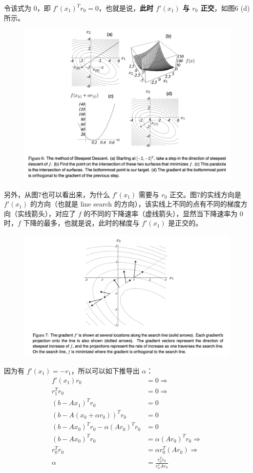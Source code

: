\documentclass[12pt]{article}
\begin{document}
令该式为 0，即 $f'(x_1)^Tr_0 = 0$，也就是说，\textbf{此时 $f'(x_1)$ 与 $r_0$ 正交}，如图6 (d) 所示。
\begin{figure}[H]
    \centering
    \includegraphics[width=1\textwidth]{fig/CG_Plot_SD_1.png}
\end{figure}

另外，从图7也可以看出来，为什么 $f'(x_1)$ 需要与 $r_0$ 正交。图7的实线方向是 $f'(x_1)$ 的方向（也就是 line search 的方向），该实线上不同的点有不同的梯度方向（实线箭头），对应了 $f$ 的不同的下降速率（虚线箭头），显然当下降速率为 0 时，$f$ 下降的最多，也就是说，此时的梯度与 $f'(x_1)$ 是正交的。
\begin{figure}[H]
    \centering
    \includegraphics[width=1\textwidth]{fig/CG_Plot_SD_2.png}
\end{figure}

因为有 $f'(x_1) = -r_1$，所以可以如下推导出 $\alpha$：
\begin{align*}
f'(x_1) r_0 &= 0 \Rightarrow \\
r_1^T r_0 &= 0 \Rightarrow \\
(b - Ax_1)^T r_0 &= 0 \\
(b - A(x_0 + \alpha r_0))^T r_0 &= 0 \\
(b - Ax_0)^T r_0 - \alpha (A r_0)^T r_0 &= 0 \\
(b - Ax_0)^T r_0 &=  \alpha (A r_0)^T r_0 \Rightarrow \\
r^T_0 r_0 &= \alpha r^T_0(Ar_0) \Rightarrow \\
\alpha &= \frac{r^T_0 r_0 }{r^T_0 A r_0}
\end{align*}
\end{document}
